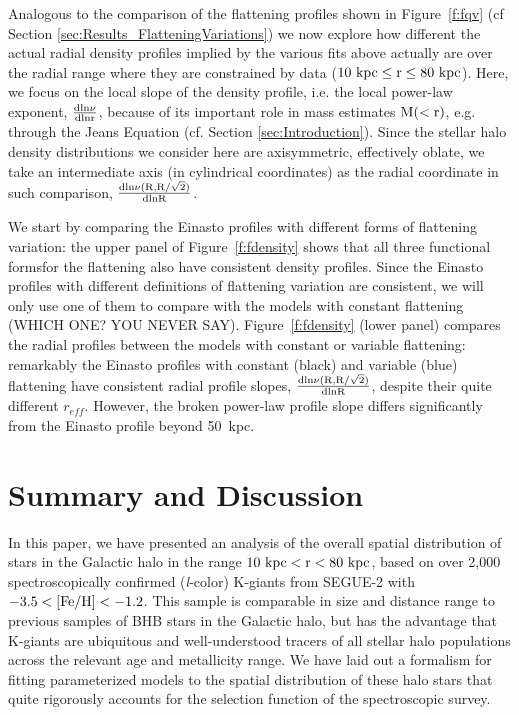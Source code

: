 \documentclass[12pt,preprint]{aastex}
\newcommand{\feh}{{\rm [Fe/H]}}
\begin{document}
Analogous to the comparison of the flattening profiles shown in Figure~\ref{f:fqv} 
(cf Section \ref{sec:Results_FlatteningVariations}) we now explore how different the 
actual radial density profiles implied by the various fits above actually are over the radial range where they are constrained by data ($10~\rm kpc \le \rm r \le 80~\rm kpc$). Here, we focus
on the local slope of the density profile, i.e. the local power-law exponent, $\rm \frac{dln\nu}{dlnr}$, because of its important role in mass estimates $\rm M(<r)$, e.g. through the Jeans Equation (cf. Section \ref{sec:Introduction}). Since the stellar halo density distributions we consider here are axisymmetric, effectively oblate, we take an intermediate axis (in cylindrical coordinates) as the radial coordinate 
in such comparison, $\rm \frac{dln\nu(R,R/\sqrt{2})}{dlnR}$.

We start by comparing the Einasto profiles with different forms of flattening variation: the upper panel of Figure~\ref{f:fdensity} shows that all three functional formsfor the flattening also have  consistent density profiles. Since the Einasto profiles with different definitions of flattening variation are consistent, we will only use one of them to compare with the models with constant flattening (WHICH ONE? YOU NEVER SAY). Figure~\ref{f:fdensity} (lower panel) compares  the radial profiles between the models with constant or variable flattening: remarkably the Einasto profiles with constant (black) and variable (blue) flattening have consistent radial profile slopes,
$\rm \frac{dln\nu(R,R/\sqrt{2})}{dlnR}$, despite their quite different $r_{eff}$.
However, the broken power-law profile slope differs significantly from the Einasto profile beyond 50~kpc.

\section{Summary and Discussion}\label{sec:Discussion}
In this paper, we have presented an analysis of the overall spatial distribution of stars in the Galactic halo in the range $10~\rm kpc < r < 80~kpc$, based on over 2,000 spectroscopically confirmed (\textit{l}-color) K-giants from SEGUE-2 with $\rm -3.5<\feh<-1.2$. 
This sample is comparable in size and distance range to previous samples of BHB stars in the Galactic halo, but has the advantage that K-giants
are ubiquitous and well-understood tracers of all stellar halo populations across the relevant age and metallicity range.  We have laid out a formalism for fitting parameterized models to the spatial distribution of these halo stars that quite rigorously accounts for the selection function of the spectroscopic survey. 
\end{document}
